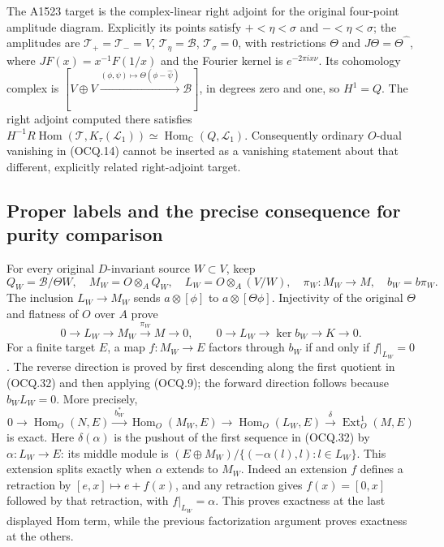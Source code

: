 The A1523 target is the complex-linear right adjoint for the original
four-point amplitude diagram.  Explicitly its points satisfy
$+<\eta<\sigma$ and $-<\eta<\sigma$; the amplitudes are
$\mathcal T_+=\mathcal T_-=V$, $\mathcal T_\eta=\mathscr B$,
$\mathcal T_\sigma=0$, with restrictions $\Theta$ and
$J\Theta=\Theta\widehat{\phantom\phi}$, where
$JF(x)=x^{-1}F(1/x)$ and the Fourier kernel is $e^{-2\pi ix\nu}$.
Its cohomology complex is
$[V\oplus V\xrightarrow{(\phi,\psi)\mapsto\Theta(\phi-\widehat\psi)}
\mathscr B]$, in degrees zero and one, so $H^1=Q$.
The right adjoint computed there satisfies
$H^{-1}R\operatorname{Hom}(\mathcal T,K_\tau(\mathcal L_1))
\simeq\operatorname{Hom}_{\mathbb C}(Q,\mathcal L_1)$.
Consequently ordinary $O$-dual vanishing in (OCQ.14) cannot be inserted
as a vanishing statement about that different, explicitly related
right-adjoint target.

\subsection{Proper labels and the precise consequence for purity comparison}

For every original $D$-invariant source $W\subset V$, keep
\[
 Q_W=\mathscr B/\Theta W,\quad M_W=O\otimes_AQ_W,\quad
 L_W=O\otimes_A(V/W),\quad
 \pi_W:M_W\to M,\quad b_W=b\pi_W.                            \tag{OCQ.31}
\]
The inclusion $L_W\to M_W$ sends $a\otimes[\phi]$ to
$a\otimes[\Theta\phi]$.  Injectivity of the original $\Theta$ and
flatness of $O$ over $A$ prove
\[
 0\to L_W\to M_W\xrightarrow{\pi_W}M\to0,\qquad
 0\to L_W\to\ker b_W\to K\to0.                              \tag{OCQ.32}
\]
For a finite target $E$, a map $f:M_W\to E$ factors through $b_W$
if and only if $f|_{L_W}=0$.  The reverse direction is proved by first
descending along the first quotient in (OCQ.32) and then applying
(OCQ.9); the forward direction follows because $b_WL_W=0$.
More precisely,
\[
 0\to\operatorname{Hom}_O(N,E)\xrightarrow{\ b_W^*\ }
 \operatorname{Hom}_O(M_W,E)\longrightarrow
 \operatorname{Hom}_O(L_W,E)\xrightarrow\delta
 \operatorname{Ext}^1_O(M,E)                                \tag{OCQ.33}
\]
is exact.  Here $\delta(\alpha)$ is the pushout of the first sequence
in (OCQ.32) by $\alpha:L_W\to E$: its middle module is
$(E\oplus M_W)/\{(-\alpha(l),l):l\in L_W\}$.
This extension splits exactly when $\alpha$ extends to $M_W$.
Indeed an extension $f$ defines a retraction by
$[e,x]\mapsto e+f(x)$, and any retraction gives $f(x)=[0,x]$
followed by that retraction, with $f|_{L_W}=\alpha$.
This proves exactness at the last displayed Hom term, while the
previous factorization argument proves exactness at the others.


